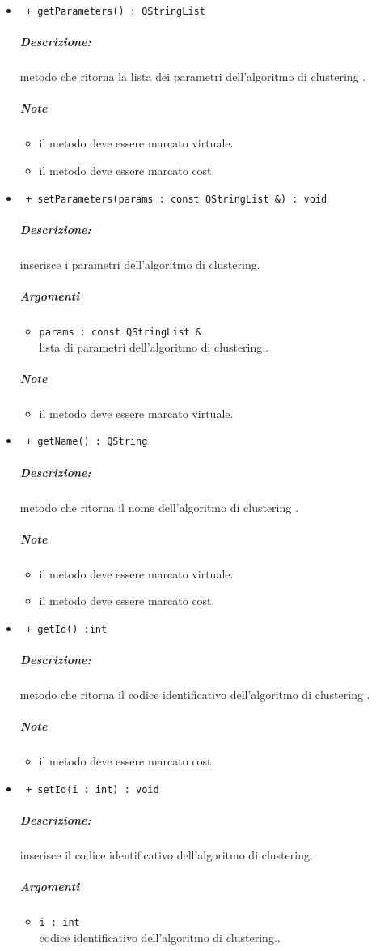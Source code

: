 \begin{itemize}
	\item \color{blue}\verb! + getParameters() : QStringList!
		\color{black}
		\subparagraph{Descrizione:} metodo che ritorna la lista dei parametri dell'algoritmo di clustering\g{} .
		\subparagraph{Note}
			\begin{itemize}
				\item il metodo deve essere marcato virtuale.
				\item il metodo deve essere marcato cost.
			\end{itemize}
			
	\item \color{blue}\verb! + setParameters(params : const QStringList &) : void!
		\color{black}
		\subparagraph{Descrizione:} inserisce i parametri dell'algoritmo di clustering\g{}.
		\subparagraph{Argomenti}
			\begin{itemize}
				\item \color{RoyalPurple} \verb!params : const QStringList & ! \\ 
				\color{black} lista di parametri dell'algoritmo di clustering\g{}..		
			\end{itemize}
		\subparagraph{Note}
			\begin{itemize}
				\item il metodo deve essere marcato virtuale.
			\end{itemize}
			
	\item \color{blue}\verb! + getName() : QString!
		\color{black}
		\subparagraph{Descrizione:} metodo che ritorna il nome dell'algoritmo di clustering\g{} .
		\subparagraph{Note}
			\begin{itemize}
				\item il metodo deve essere marcato virtuale.
				\item il metodo deve essere marcato cost.
			\end{itemize}
			
	\item \color{blue}\verb! + getId() :int!
		\color{black}
		\subparagraph{Descrizione:} metodo che ritorna il codice identificativo dell'algoritmo di clustering\g{} .
		\subparagraph{Note}
			\begin{itemize}
				\item il metodo deve essere marcato cost.
			\end{itemize}
				
	\item \color{blue}\verb! + setId(i : int) : void!
		\color{black}
		\subparagraph{Descrizione:} inserisce il codice identificativo dell'algoritmo di clustering\g{}.
		\subparagraph{Argomenti}
			\begin{itemize}
				\item \color{RoyalPurple} \verb!i : int ! \\ 
				\color{black} codice identificativo dell'algoritmo di clustering\g{}..		
			\end{itemize}
		

\end{itemize}
